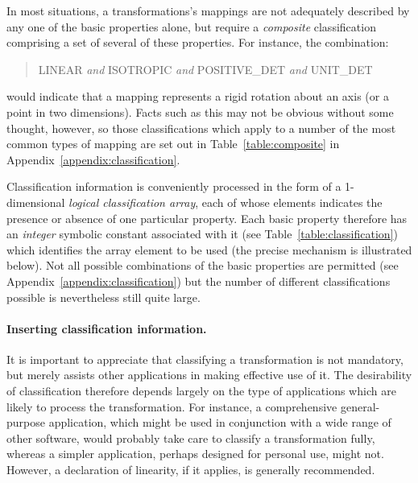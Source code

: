 \documentclass[twoside,11pt]{article}
\newcommand{\name}[1]{\mbox{\small{#1}}}
\begin{document}
In most situations, a transformations's mappings are not adequately
described by any one of the basic properties alone, but require a
\emph{composite} classification comprising a set of several of these
properties.  For instance, the combination:

\begin{quote}
\begin{center}

\name{LINEAR} \emph{and} \name{ISOTROPIC} \emph{and} \name{POSITIVE\_DET} 
\emph{and} \name{UNIT\_DET}

\end{center}
\end{quote}

would indicate that a mapping represents a rigid rotation about an axis (or a
point in two dimensions). 
Facts such as this may not be obvious without some thought, however, so
those classifications which apply to a number of the most common types of
mapping are set out in Table~\ref{table:composite} in
Appendix~\ref{appendix:classification}. 

Classification information is conveniently processed in the form of a
1-dimensional \emph{logical classification array}, each of whose elements
indicates the presence or absence of one particular property. 
Each basic property therefore has an \emph{integer} symbolic constant
associated with it (see Table~\ref{table:classification}) which identifies
the array element to be used (the precise mechanism is illustrated below). 
Not all possible combinations of the basic properties are permitted (see
Appendix~\ref{appendix:classification}) but the number of different
classifications possible is nevertheless still quite large. 

\paragraph{Inserting classification information.}
It is important to appreciate that classifying a transformation is not
mandatory, but merely assists other applications in making effective
use of it.
The desirability of classification therefore depends largely on the type of
applications which are likely to process the transformation. 
For instance, a comprehensive general-purpose application, which might be
used in conjunction with a wide range of other software, would probably take
care to classify a transformation fully, whereas a simpler application,
perhaps designed for personal use, might not. 
However, a declaration of linearity, if it applies, is generally
recommended. 
\end{document}
